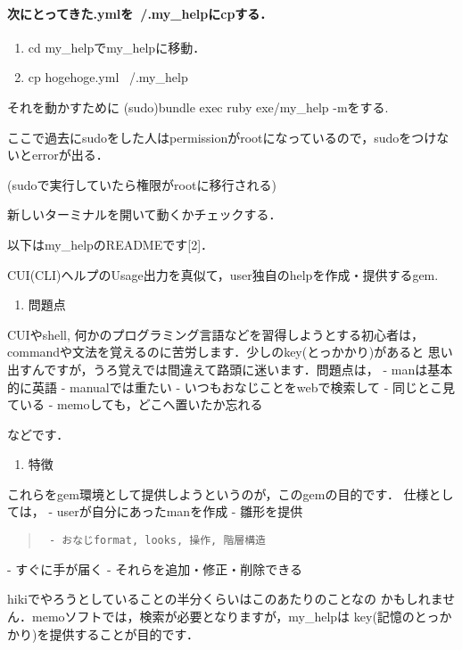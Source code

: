 \paragraph{次にとってきた.ymlを~/.my\_helpにcpする．}
\begin{enumerate}
\item cd my\_helpでmy\_helpに移動．
\item cp hogehoge.yml ~/.my\_help
\end{enumerate}
それを動かすために
(sudo)bundle exec ruby exe/my\_help -mをする.

ここで過去にsudoをした人はpermissionがrootになっているので，sudoをつけないとerrorが出る．

(sudoで実行していたら権限がrootに移行される)

新しいターミナルを開いて動くかチェックする．

以下はmy\_helpのREADMEです[2]．

CUI(CLI)ヘルプのUsage出力を真似て，user独自のhelpを作成・提供するgem.

\begin{enumerate}
\item 問題点
\end{enumerate}
CUIやshell, 何かのプログラミング言語などを習得しようとする初心者は，
commandや文法を覚えるのに苦労します．少しのkey(とっかかり)があると
思い出すんですが，うろ覚えでは間違えて路頭に迷います．問題点は，
- manは基本的に英語
- manualでは重たい
- いつもおなじことをwebで検索して
- 同じとこ見ている
- memoしても，どこへ置いたか忘れる

などです．

\begin{enumerate}
\item 特徴
\end{enumerate}
これらをgem環境として提供しようというのが，このgemの目的です．
仕様としては，
- userが自分にあったmanを作成
- 雛形を提供
\begin{quote}\begin{verbatim}
 - おなじformat, looks, 操作, 階層構造
\end{verbatim}\end{quote}
- すぐに手が届く
- それらを追加・修正・削除できる

hikiでやろうとしていることの半分くらいはこのあたりのことなの
かもしれません．memoソフトでは，検索が必要となりますが，my\_helpは
key(記憶のとっかかり)を提供することが目的です．

